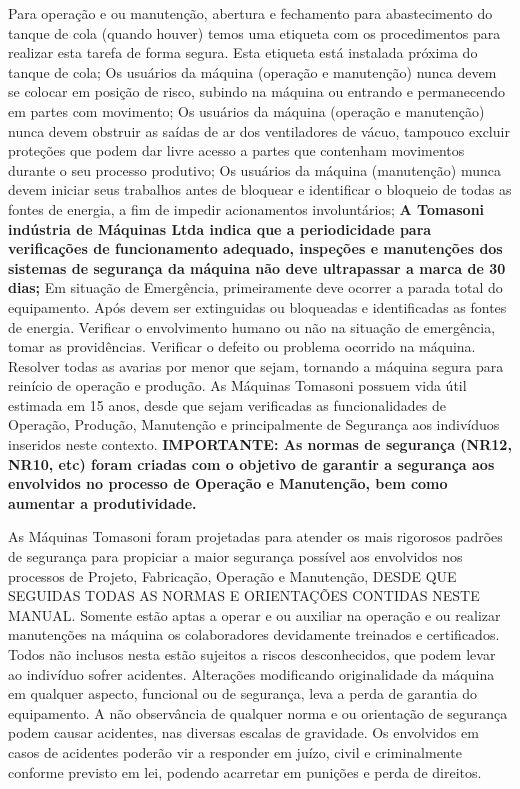 Para operação e ou manutenção, abertura e fechamento para abastecimento do tanque de cola (quando houver) temos
uma etiqueta com os procedimentos para realizar esta tarefa de forma segura. Esta etiqueta está instalada próxima do
tanque de cola;
Os usuários da máquina (operação e manutenção) nunca devem se colocar em posição de risco, subindo na máquina ou
entrando e permanecendo em partes com movimento;
Os usuários da máquina (operação e manutenção) nunca devem obstruir as saídas de ar dos ventiladores de vácuo,
tampouco excluir proteções que podem dar livre acesso a partes que contenham movimentos durante o seu processo
produtivo;
Os usuários da máquina (manutenção) munca devem iniciar seus trabalhos antes de bloquear e identificar o bloqueio de
todas as fontes de energia, a fim de impedir acionamentos involuntários;
\textbf{A Tomasoni indústria de Máquinas Ltda indica que a periodicidade para verificações de funcionamento adequado,
inspeções e manutenções dos sistemas de segurança da máquina não deve ultrapassar a marca de 30 dias;}
Em situação de Emergência, primeiramente deve ocorrer a parada total do equipamento. Após devem ser extinguidas ou
bloqueadas e identificadas as fontes de energia. Verificar o envolvimento humano ou não na situação de emergência,
tomar as providências. Verificar o defeito ou problema ocorrido na máquina. Resolver todas as avarias por menor que
sejam, tornando a máquina segura para reinício de operação e produção.
As Máquinas Tomasoni possuem vida útil estimada em 15 anos, desde que sejam verificadas as funcionalidades de
Operação, Produção, Manutenção e principalmente de Segurança aos indivíduos inseridos neste contexto.
\textbf{IMPORTANTE: As normas de segurança (NR12, NR10, etc) foram criadas com o objetivo de garantir a segurança aos
envolvidos no processo de Operação e Manutenção, bem como aumentar a produtividade.
}


\newpage
\thispagestyle{fancy}
\vspace*{50 pt}

As Máquinas Tomasoni foram projetadas para atender os mais rigorosos padrões de segurança para propiciar a maior segurança possível 
aos envolvidos nos processos de Projeto, Fabricação, Operação e Manutenção, DESDE QUE SEGUIDAS TODAS AS NORMAS E ORIENTAÇÕES CONTIDAS NESTE MANUAL.
Somente estão aptas a operar e ou auxiliar na operação e ou realizar
manutenções na máquina os colaboradores devidamente treinados e certificados.
Todos não inclusos nesta estão sujeitos a riscos desconhecidos, que podem
levar ao indivíduo sofrer acidentes.
Alterações modificando originalidade da máquina em qualquer aspecto, funcional
ou de segurança, leva a perda de garantia do equipamento.
A não observância de qualquer norma e ou orientação de segurança podem causar
acidentes, nas diversas escalas de gravidade. Os envolvidos em casos de
acidentes poderão vir a responder em juízo, civil e criminalmente conforme
previsto em lei, podendo acarretar em punições e perda de direitos.

